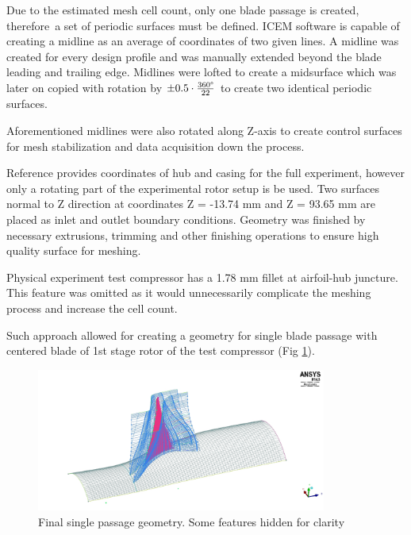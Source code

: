 Due to the estimated mesh cell count, only one blade passage is created, therefore~a set of periodic surfaces must be defined. ICEM software is capable of creating a midline as an average of coordinates of two given lines. A midline was created for every design profile and was manually extended beyond the blade leading and trailing edge. Midlines were lofted to create a midsurface which was later on copied with rotation by $\pm 0.5 \cdot \frac{360 \degree}{22}$ to create two identical periodic surfaces.

Aforementioned midlines were also rotated along Z-axis to create control surfaces for mesh stabilization and data acquisition down the process.

Reference \citep{r67laser} provides coordinates of hub and casing for the full experiment, however only a rotating part of the experimental rotor setup is be used. Two surfaces normal to Z direction at coordinates Z = -13.74 mm and Z = 93.65 mm are placed as inlet and outlet boundary conditions. Geometry was finished by necessary extrusions, trimming and other finishing operations to ensure high quality surface for meshing.

Physical experiment test compressor has a 1.78 mm fillet at airfoil-hub juncture. This feature was omitted as it would unnecessarily complicate the meshing process and increase the cell count.

Such approach allowed for creating a geometry for single blade passage with centered blade of 1st stage rotor of the test compressor (Fig \ref{geom_final}).

\begin{figure}[ht!]
\centering %
\includegraphics[width=0.85\textwidth]{Pictures/r67_geom.jpg}
\caption{Final single passage geometry. Some features hidden for clarity}
\label{geom_final}
\end{figure}

